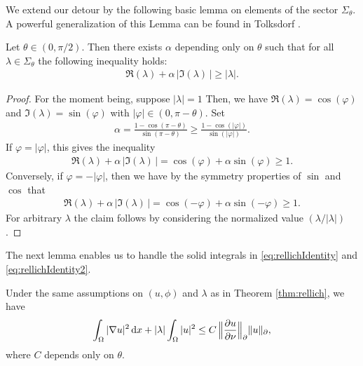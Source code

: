 We extend our detour by the following basic lemma on elements of the sector $\Sigma_\theta$.
A powerful generalization of this Lemma can be found in Tolksdorf \cite[Lem. 5.2.4]{tolksdorf}.

\begin{lem}
  \label{lem:lambdaIneq}
  Let $\theta \in (0,\pi/2)$.
  Then there exists $\alpha$ depending only on $\theta$ such that for all $\lambda \in \Sigma_\theta$ the following inequality holds:
  \begin{align*}
    \Re(\lambda) + \alpha \, \big|\Im(\lambda)\,\big| \geq |\lambda|.
  \end{align*}
\end{lem}

\begin{proof}
  For the moment being, suppose $|\lambda| = 1$ Then, we have $\Re(\lambda) = \cos(\varphi)$ and $\Im(\lambda) = \sin(\varphi)$ with $|\varphi| \in (0, \pi - \theta)$. 
  Set
  \begin{align*}
    \alpha = \frac{1 - \cos(\pi - \theta)}{\sin(\pi - \theta)} \geq \frac{1 - \cos(|\varphi|)}{\sin(|\varphi|)}.
  \end{align*}
  If $\varphi = |\varphi|$, this gives the inequality
  \begin{align*}
    \Re(\lambda) + \alpha \, |\Im(\lambda)\,| = \cos(\varphi) + \alpha \sin(\varphi) \geq 1.
  \end{align*}
  Conversely, if $\varphi = -|\varphi|$, then we have by the symmetry properties of $\sin$ and $\cos$ that
  \begin{align*}
    \Re(\lambda) + \alpha\, |\Im(\lambda)\,| = \cos(-\varphi) + \alpha \sin(-\varphi) \geq 1.
  \end{align*}
  For arbitrary $\lambda$ the claim follows by considering the normalized value $(\lambda / |\lambda|)$.
\end{proof}

The next lemma enables us to handle the solid integrals in \eqref{eq:rellichIdentity} and \eqref{eq:rellichIdentity2}.

\begin{lem}
  \label{lem:laxMilgramIneq}
  Under the same assumptions on $(u,\phi)$ and $\lambda$ as in Theorem \ref{thm:rellich}, we have
  \begin{align}
    \label{eq:laxMilgramIneq}
    \int_\Omega |\nabla u|^2 \, {\operatorname{d}\!{x}} + |\lambda| \int_\Omega |u|^2 \leq C \,\Big\| \frac{\partial u}{\partial \nu} \Big\|_\partial  \|u\|_\partial,
  \end{align}
  where $C$ depends only on $\theta$.
\end{lem}

